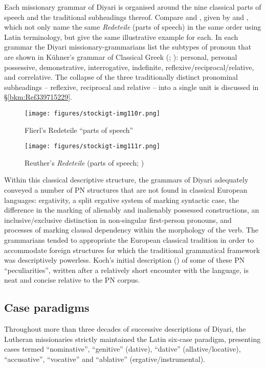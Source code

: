 \newpage
Each missionary grammar of Diyari is organised around the nine classical parts of speech and the traditional subheadings thereof. Compare  and , given by \citet{flierl_christianieli_1880} and \citet{reuther_dieri_1894}, which not only name the same \textit{Redeteile} (parts of speech) in the same order using Latin terminology, but give the same illustrative example for each. In each grammar the Diyari missionary-grammarians list the subtypes of pronoun that are shown in Kühner’s grammar of Classical Greek (\citeyear[xxiii]{raphael_ausfuhrliche_1834}; ): personal, personal possessive, demonstrative, interrogative, indefinite, reflexive/reciprocal/relative, and correlative. The collapse of the three traditionally distinct pronominal subheadings – reflexive, reciprocal and relative – into a single unit is discussed in §\ref{bkm:Ref339715229}.


\begin{figure}[t]
\texttt{[image: figures/stockigt-img110r.png]}
\caption{Flierl’s Redeteile “parts of speech” \citeyearpar[6]{flierl_christianieli_1880}}
\label{bkm:Ref449376051}\label{fig:key:161}
\end{figure}


\begin{figure}[t]
\texttt{[image: figures/stockigt-img111r.png]}
\caption{Reuther’s \textit{Redeteile} (parts of speech; \citeyear[2]{reuther_dieri_1894})}
\label{bkm:Ref449376087}\label{fig:key:162}
\end{figure}


Within this classical descriptive structure, the grammars of Diyari adequately conveyed a number of PN structures that are not found in classical European languages: ergativity, a split ergative system of marking syntactic case, the difference in the marking of alienably and inalienably possessed constructions, an inclusive/exclusive distinction in non-singular first-person pronouns, and processes of marking clausal dependency within the morphology of the verb. The grammarians tended to appropriate the European classical tradition in order to accommodate foreign structures for which the traditional grammatical framework was descriptively powerless. Koch’s initial description (\citeyear{koch_untitled_1868}) of some of these PN ``peculiarities'', written after a relatively short encounter with the language, is neat and concise relative to the PN corpus.

\subsection{Case paradigms}
\label{sec:key:8.5.1}\label{bkm:Ref326948838}\label{bkm:Ref326948895}
{{Throughout more than three decades of successive descriptions of Diyari, the Lutheran missionaries strictly maintained the Latin six-case paradigm, presenting cases termed “nominative'', “genitive” (dative), “dative” (allative/locative), “accusative'', “vocative” and “ablative” (ergative/instrumental).} }

